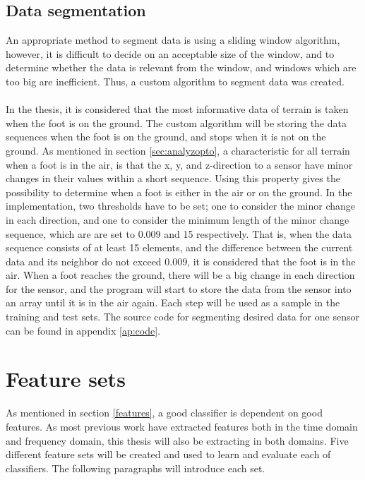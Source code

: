 \documentclass[USenglish]{ifimaster}  %
\begin{document}
\subsection{Data segmentation} \label{subseq:segmentation}
An appropriate method to segment data is using a sliding window algorithm, however, it is difficult to decide on an acceptable size of the window, and to determine whether the data is relevant from the window, and windows which are too big are inefficient. Thus, a custom algorithm to segment data was created. 
\\
\\
In the thesis, it is considered that the most informative data of terrain is taken when the foot is on the ground. The custom algorithm will be storing the data sequences when the foot is on the ground, and stops when it is not on the ground. As mentioned in section \ref{sec:analyzopto}, a characteristic for all terrain when a foot is in the air, is that the x, y, and z-direction to a sensor have minor changes in their values within a short sequence. Using this property gives the possibility to determine when a foot is either in the air or on the ground. In the implementation, two thresholds have to be set; one to consider the minor change in each direction, and one to consider the minimum length of the minor change sequence, which are are set to 0.009 and 15 respectively. That is, when the data sequence consists of at least 15 elements, and the difference between the current data and its neighbor do not exceed 0.009, it is considered that the foot is in the air. When a foot reaches the ground, there will be a big change in each direction for the sensor, and the program will start to store the data from the sensor into an array until it is in the air again. Each step will be used as a sample in the training and test sets. The source code for segmenting desired data for one sensor can be found in appendix \ref{ap:code}.

\section{Feature sets}\label{sec:featuresets}
As mentioned in section \ref{features}, a good classifier is dependent on good features. As most previous work have extracted features both in the time domain and frequency domain, this thesis will also be extracting in both domains. Five different feature sets will be created and used to learn and evaluate each of classifiers. The following paragraphs will introduce each set.
\end{document}
